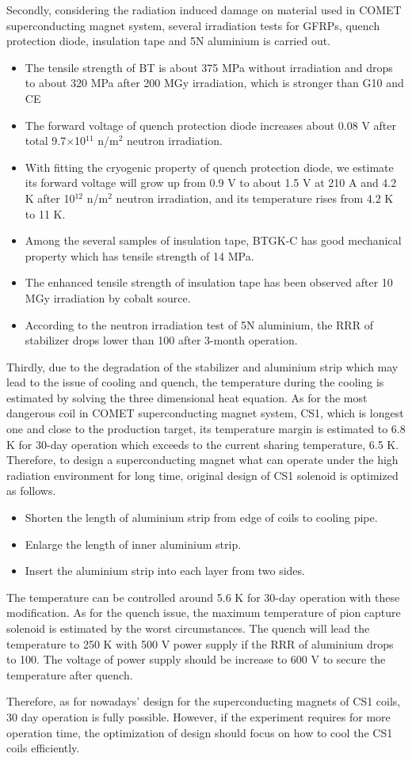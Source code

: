 Secondly, considering the radiation induced damage on material used in COMET superconducting magnet system, several irradiation tests for GFRPs, quench protection diode, insulation tape and 5N aluminium is carried out.
\begin{itemize}
 \setlength{\itemsep}{-5pt}
 \item The tensile strength of BT is about 375 MPa without irradiation and drops to about 320 MPa after 200 MGy irradiation, which is stronger than G10 and CE
 \item The forward voltage of quench protection diode increases about 0.08 V after total 9.7$\times$10$^{11}$ n/m$^2$ neutron irradiation.
 \item With fitting the cryogenic property of quench protection diode, we estimate its forward voltage will grow up from 0.9 V to about 1.5 V at 210 A and 4.2 K after 10$^{12}$ n/m$^2$ neutron irradiation, and its temperature rises from 4.2 K to 11 K.
 \item Among the several samples of insulation tape, BTGK-C has good mechanical property which has tensile strength of 14 MPa.
 \item The enhanced tensile strength of insulation tape has been observed after 10 MGy irradiation by cobalt source.
 \item According to the neutron irradiation test of 5N aluminium, the RRR of stabilizer drops lower than 100 after 3-month operation.
\end{itemize}

Thirdly, due to the degradation of the stabilizer and aluminium strip which may lead to the issue of cooling and quench, the temperature during the cooling is estimated by solving the three dimensional heat equation.
As for the most dangerous coil in COMET superconducting magnet system, CS1, which is longest one and close to the production target, its temperature margin is estimated to 6.8 K for 30-day operation which exceeds to the current sharing temperature, 6.5 K.
Therefore, to design a superconducting magnet what can operate under the high radiation environment for long time, original design of CS1 solenoid is optimized as follows.
\begin{itemize}
 \setlength{\itemsep}{-5pt}
 \item Shorten the length of aluminium strip from edge of coils to cooling pipe.
 \item Enlarge the length of inner aluminium strip.
 \item Insert the aluminium strip into each layer from two sides.
\end{itemize}
The temperature can be controlled around 5.6 K for 30-day operation with these modification.
As for the quench issue, the maximum temperature of pion capture solenoid is estimated by the worst circumstances.
The quench will lead the temperature to 250 K with 500 V power supply if the RRR of aluminium drops to 100.
The voltage of power supply should be increase to 600 V to secure the temperature after quench.

Therefore, as for nowadays' design for the superconducting magnets of CS1 coils, 30 day operation is fully possible.
However, if the experiment requires for more operation time, the optimization of design should focus on how to cool the CS1 coils efficiently.
